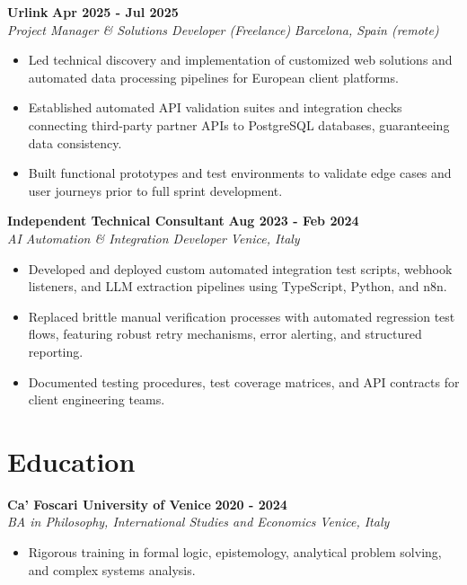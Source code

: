 \documentclass[10pt,a4paper]{article}
\newcommand{\role}[4]{%
  \textbf{#1} \hfill \textbf{#2}\\[1pt]%
  \textit{#3} \hfill \textit{#4}\\[2pt]%
}
\begin{document}
\role{Urlink}{Apr 2025 - Jul 2025}{Project Manager \& Solutions Developer (Freelance)}{Barcelona, Spain (remote)}
\begin{itemize}
  \item Led technical discovery and implementation of customized web solutions and automated data processing pipelines for European client platforms.
  \item Established automated API validation suites and integration checks connecting third-party partner APIs to PostgreSQL databases, guaranteeing data consistency.
  \item Built functional prototypes and test environments to validate edge cases and user journeys prior to full sprint development.
\end{itemize}

\role{Independent Technical Consultant}{Aug 2023 - Feb 2024}{AI Automation \& Integration Developer}{Venice, Italy}
\begin{itemize}
  \item Developed and deployed custom automated integration test scripts, webhook listeners, and LLM extraction pipelines using TypeScript, Python, and n8n.
  \item Replaced brittle manual verification processes with automated regression test flows, featuring robust retry mechanisms, error alerting, and structured reporting.
  \item Documented testing procedures, test coverage matrices, and API contracts for client engineering teams.
\end{itemize}

\section{Education}
\role{Ca' Foscari University of Venice}{2020 - 2024}{BA in Philosophy, International Studies and Economics}{Venice, Italy}
\begin{itemize}
  \item Rigorous training in formal logic, epistemology, analytical problem solving, and complex systems analysis.
\end{itemize}
\end{document}
